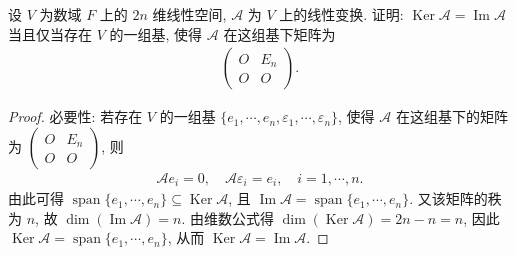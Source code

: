 \documentclass[../../main.tex]{subfiles}%
\begin{document}
\begin{example}
设 \(V\) 为数域 \(F\) 上的 \(2n\) 维线性空间, \(\mathscr{A}\) 为 \(V\) 上的线性变换. 证明: \(\operatorname{Ker} \mathscr{A} = \operatorname{Im} \mathscr{A}\) 当且仅当存在 \(V\) 的一组基, 使得 \(\mathscr{A}\) 在这组基下矩阵为
\begin{align*}
\begin{pmatrix}
O & E_n \\
O & O
\end{pmatrix}.
\end{align*}
\end{example}
\begin{proof}

{\heiti 必要性:} 若存在 \(V\) 的一组基 \(\{e_1,\cdots,e_n,\varepsilon_1,\cdots,\varepsilon_n\}\), 使得 \(\mathscr{A}\) 在这组基下的矩阵为 \(\begin{pmatrix} O & E_n \\ O & O \end{pmatrix}\), 则
\begin{align*}
\mathscr{A} e_i=0,\quad \mathscr{A} \varepsilon _i=e_i,\quad i=1,\cdots ,n.
\end{align*}
由此可得 \(\operatorname{span}\{e_1,\cdots,e_n\}\subseteq \operatorname{Ker} \mathscr{A}\), 且 \(\operatorname{Im} \mathscr{A} = \operatorname{span}\{e_1,\cdots,e_n\}\). 又该矩阵的秩为 \(n\), 故 \(\dim(\operatorname{Im}\mathscr{A})=n\). 由维数公式得 \(\dim(\operatorname{Ker}\mathscr{A})=2n-n=n\), 因此 \(\operatorname{Ker}\mathscr{A}=\operatorname{span}\{e_1,\cdots,e_n\}\), 从而 \(\operatorname{Ker}\mathscr{A}=\operatorname{Im}\mathscr{A}\).


\end{proof}
\end{document}
